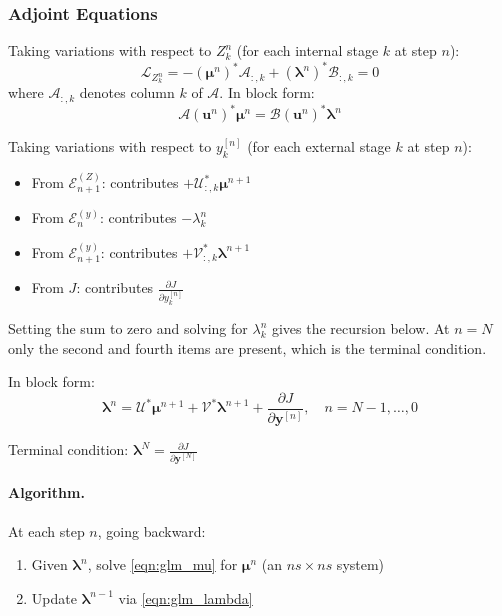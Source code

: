\documentclass[11pt]{article}
\newcommand{\LL}{\mathcal{L}}
\newcommand{\herm}{^\ast}
\newcommand{\pder}[2]{\frac{\partial #1}{\partial #2}}
\newcommand{\yv}{\mathbf{y}}
\newcommand{\uv}{\mathbf{u}}
\newcommand{\lv}{\boldsymbol{\lambda}}
\newcommand{\mv}{\boldsymbol{\mu}}
\newcommand{\Av}{\mathcal{A}}
\newcommand{\Bv}{\mathcal{B}}
\newcommand{\Uv}{\mathcal{U}}
\newcommand{\Vv}{\mathcal{V}}
\begin{document}
\subsubsection{Adjoint Equations}

Taking variations with respect to $Z_k^n$ (for each internal stage $k$ at step $n$):
\begin{equation}
\LL_{Z_k^n} = -(\mv^n)\herm \Av_{:,k} + (\lv^n)\herm \Bv_{:,k} = 0
\end{equation}
where $\Av_{:,k}$ denotes column $k$ of $\Av$. In block form:
\begin{equation}
\label{eqn:glm_mu}
\boxed{\Av(\uv^n)\herm \mv^n = \Bv(\uv^n)\herm \lv^n}
\end{equation}

Taking variations with respect to $y_k^{[n]}$ (for each external stage $k$ at step $n$):
\begin{itemize}
\item From $\mathcal{E}^{(Z)}_{n+1}$: contributes $+\Uv\herm_{:,k} \mv^{n+1}$
\item From $\mathcal{E}^{(y)}_n$: contributes $-\lambda_k^n$
\item From $\mathcal{E}^{(y)}_{n+1}$: contributes $+\Vv\herm_{:,k} \lv^{n+1}$
\item From $J$: contributes $\pder{J}{y_k^{[n]}}$
\end{itemize}

Setting the sum to zero and solving for $\lambda_k^n$ gives the recursion below.
At $n = N$ only the second and fourth items are present, which is the terminal
condition.

In block form:
\begin{equation}
\label{eqn:glm_lambda}
\boxed{\lv^n = \Uv\herm \mv^{n+1} + \Vv\herm \lv^{n+1} + \pder{J}{\yv^{[n]}}, \quad n = N-1, \ldots, 0}
\end{equation}

Terminal condition: $\lv^N = \pder{J}{\yv^{[N]}}$

\paragraph{Algorithm.} At each step $n$, going backward:
\begin{enumerate}
\item Given $\lv^n$, solve \eqref{eqn:glm_mu} for $\mv^n$ (an $ns \times ns$ system)
\item Update $\lv^{n-1}$ via \eqref{eqn:glm_lambda}
\end{enumerate}
\end{document}
